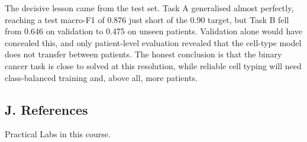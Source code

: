 \documentclass[
  11pt,
]{article}
\begin{document}
The decisive lesson came from the test set. Task A generalised almost
perfectly, reaching a test macro-F1 of 0.876 just short of the 0.90
target, but Task B fell from 0.646 on validation to 0.475 on unseen
patients. Validation alone would have concealed this, and only
patient-level evaluation revealed that the cell-type model does not
transfer between patients. The honest conclusion is that the binary
cancer task is close to solved at this resolution, while reliable cell
typing will need class-balanced training and, above all, more patients.

\hypertarget{j.-references}{%
\subsection{J. References}\label{j.-references}}
Practical Labs in this course.
\end{document}
